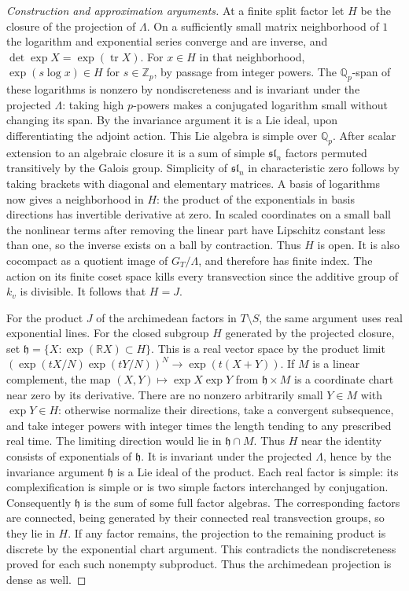 \documentclass[11pt,a4paper,openany,oneside]{book}
\theoremstyle{resultstyle}
\theoremstyle{definition}
\numberwithin{equation}{chapter}
\begin{document}
\begin{proof}[Construction and approximation arguments]
At a finite split factor let \(H\) be the closure of the
projection of \(\Lambda\). On a sufficiently small matrix
neighborhood of \(1\) the logarithm and exponential series
converge and are inverse, and \(\det\exp X=\exp(\operatorname{tr}X)\).
For \(x\in H\) in that neighborhood,
\(\exp(s\log x)\in H\) for \(s\in\mathbb Z_p\), by passage from
integer powers. The \(\mathbb Q_p\)-span of these logarithms is
nonzero by nondiscreteness and is invariant under the projected
\(\Lambda\): taking high \(p\)-powers makes a conjugated
logarithm small without changing its span. By the invariance
argument it is a Lie ideal, upon differentiating the adjoint
action. This Lie algebra is simple over \(\mathbb Q_p\).
After scalar extension to an algebraic closure it is a sum of
simple \(\mathfrak{sl}_n\) factors permuted transitively by the
Galois group. Simplicity of \(\mathfrak{sl}_n\) in characteristic
zero follows by taking brackets with diagonal and elementary
matrices. A basis of logarithms now gives a neighborhood in \(H\):
the product of the exponentials in basis directions has
invertible derivative at zero. In scaled coordinates on a small
ball the nonlinear terms after removing the linear part have
Lipschitz constant less than one, so the inverse exists on a
ball by contraction. Thus \(H\) is open. It is also cocompact
as a quotient image of \(G_T/\Lambda\), and therefore has finite
index. The action on its finite coset space kills every
transvection since the additive group of \(k_v\) is divisible.
It follows that \(H=J\).

For the product \(J\) of the archimedean factors in \(T\setminus
S\), the same argument uses real exponential lines. For the
closed subgroup \(H\) generated by the projected closure, set
\(\mathfrak h=\{X:\exp(\mathbb R X)\subset H\}\).
This is a real vector space by the product limit
\((\exp(tX/N)\exp(tY/N))^N\to\exp(t(X+Y))\). If \(M\) is a
linear complement, the map
\((X,Y)\mapsto\exp X\exp Y\) from \(\mathfrak h\times M\) is a
coordinate chart near zero by its derivative. There are no
nonzero arbitrarily small \(Y\in M\) with \(\exp Y\in H\):
otherwise normalize their directions, take a convergent
subsequence, and take integer powers with integer times the
length tending to any prescribed real time. The limiting
direction would lie in \(\mathfrak h\cap M\). Thus \(H\) near
the identity consists of exponentials of \(\mathfrak h\).
It is invariant under the projected \(\Lambda\), hence by the
invariance argument \(\mathfrak h\) is a Lie ideal of the product.
Each real factor is simple: its complexification is simple
or is two simple factors interchanged by conjugation.
Consequently \(\mathfrak h\) is the sum of some full factor
algebras. The corresponding factors are connected, being
generated by their connected real transvection groups, so they
lie in \(H\). If any factor remains, the projection to the
remaining product is discrete by the exponential chart
argument. This contradicts the nondiscreteness proved for each
such nonempty subproduct. Thus the archimedean projection is
dense as well.


\end{proof}
\end{document}
